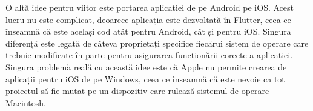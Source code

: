 \documentclass[12pt,a4paper]{report}
\theoremstyle{definition}
\theoremstyle{remark}
\begin{document}
O altă idee pentru viitor este portarea aplicației de pe Android pe iOS. Acest lucru nu este complicat, deoarece aplicația este dezvoltată în Flutter, ceea ce înseamnă că este același cod atât pentru Android, cât și pentru iOS. Singura diferență este legată de câteva proprietăți specifice fiecărui sistem de operare care trebuie modificate în parte pentru asigurarea funcționării corecte a aplicației. Singura problemă reală cu această idee este că Apple nu permite crearea de aplicații pentru iOS de pe Windows, ceea ce înseamnă că este nevoie ca tot proiectul să fie mutat pe un dispozitiv care rulează sistemul de operare Macintosh.




\end{document}
